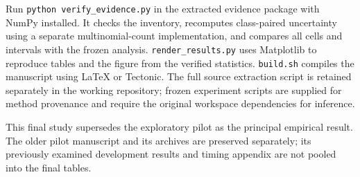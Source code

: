 \documentclass[10pt,twocolumn]{article}
\begin{document}
Run \texttt{python verify\_evidence.py} in the extracted evidence package with NumPy installed. It checks the inventory, recomputes class-paired uncertainty using a separate multinomial-count implementation, and compares all cells and intervals with the frozen analysis. \texttt{render\_results.py} uses Matplotlib to reproduce tables and the figure from the verified statistics. \texttt{build.sh} compiles the manuscript using LaTeX or Tectonic. The full source extraction script is retained separately in the working repository; frozen experiment scripts are supplied for method provenance and require the original workspace dependencies for inference.

This final study supersedes the exploratory pilot as the principal empirical result. The older pilot manuscript and its archives are preserved separately; its previously examined development results and timing appendix are not pooled into the final tables.
\end{document}
